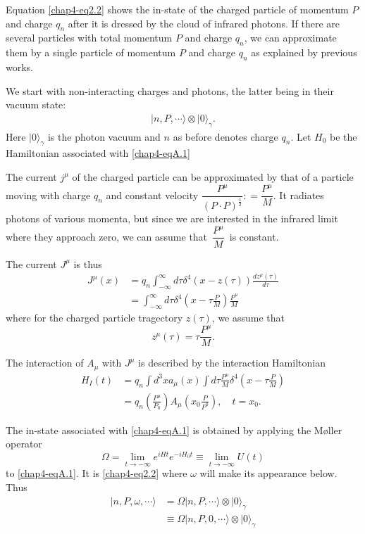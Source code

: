 Equation \eqref{chap4-eq2.2} shows the in-state of the charged particle of momentum $P$ and charge $q_n$ after it is dressed by the cloud of infrared photons. If there are several particles with total momentum $P$ and charge $q_n$, we can approximate them by a single particle of momentum $P$ and charge $q_n$ as explained by previous works.

We start with non-interacting charges and photons, the latter being in their vacuum state:
\begin{align*}
  |n, P, \cdots \rangle \otimes | 0 \rangle_\gamma. \label{chap4-eqA.1}\tag{A.1}
\end{align*}
Here $|0 \rangle_\gamma$ is the photon vacuum and $n$ as before denotes charge $q_n$. Let $H_0$ be the Hamiltonian associated with \eqref{chap4-eqA.1}

The current $j^\mu$ of the charged particle can be approximated by that of a particle moving with charge $q_n$ and constant velocity $\dfrac{P^\mu}{(P\cdot P)^{\frac{1}{2}}}: = \dfrac{P^\mu}{M}$. It radiates photons of various momenta, but since we are interested in the infrared limit where they approach zero, we can assume that $\,\dfrac{P^\mu}{M}\,$ is constant.

The current $J^\mu$ is thus
\begin{align*}
  J^\mu (x) & = q_n \int^\infty_{-\infty} d \tau \delta^4 (x- z (\tau)) \frac{dz^\mu(\tau)}{d\tau}\\
  & = \int^\infty_{-\infty} d \tau \delta^4 \left(x- \tau \frac{P}{M}\right) \frac{P^\mu}{M}\label{chap4-eqA.2}\tag{A.2}
\end{align*}
where for the charged particle tragectory $z(\tau)$, we assume that
\begin{equation*}
z^\mu (\tau) = \tau \frac{P^\mu}{M}. \label{chap4-eqA.3}\tag{A.3}
\end{equation*}

The interaction of $A_\mu$ with $J^\mu$ is described by the interaction Hamiltonian
\eject
\begin{align*}
  H_I(t) & = q_n \int d^3 x a_\mu (x) \int d \tau \frac{P^\mu}{M} \delta^4 \left( x- \tau \frac{P}{M} \right) \label{chap4-eqA.4}\tag{A.4}\\
  & = q_n \left( \frac{P^\mu}{P_0}\right) A_\mu \left( x_0 \frac{P}{P^0}\right), \quad t= x_0. \label{chap4-eqA.5}\tag{A.5}
\end{align*}

The in-state associated with \eqref{chap4-eqA.1} is obtained by applying the M\o{}ller operator
\begin{equation*}
\Omega = \lim\limits_{t \to -\infty} e^{iHt}e^{-iH_0t}\equiv \lim\limits_{t \to -\infty} U(t)\label{chap4-eqA.6}\tag{A.6}
\end{equation*}
to \eqref{chap4-eqA.1}. It is \eqref{chap4-eq2.2} where $\omega$ will make its appearance below. Thus
\begin{align*}
  | n, P, \omega, \cdots \rangle & = \Omega | n, P, \cdots \rangle \otimes | 0 \rangle_\gamma\\
  & \equiv \Omega|n, P, 0, \cdots \rangle \otimes |0 \rangle_\gamma \label{chap4-eqA.7}\tag{A.7}
\end{align*}

